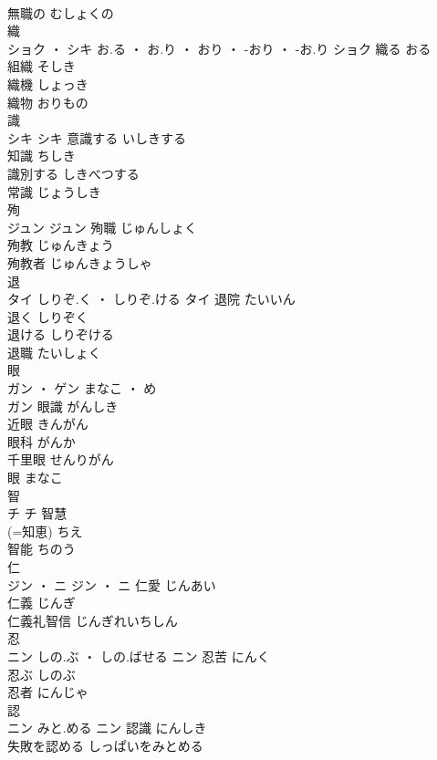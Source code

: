 \documentclass[8pt]{extreport}
\begin{document}
\begin{CJK}{UTF8}{min}
\\	無職の	むしょくの	
\\	織	
\\	ショク ・ シキ	お.る ・ お.り ・ おり ・ -おり ・ -お.り	ショク	織る	おる	
\\	組織	そしき	
\\	織機	しょっき	
\\	織物	おりもの	
\\	識	
\\	シキ		シキ	意識する	いしきする	
\\	知識	ちしき	
\\	識別する	しきべつする	
\\	常識	じょうしき	
\\	殉	
\\	ジュン		ジュン	殉職	じゅんしょく	
\\	殉教	じゅんきょう	
\\	殉教者	じゅんきょうしゃ	
\\	退	
\\	タイ	しりぞ.く ・ しりぞ.ける	タイ	退院	たいいん	
\\	退く	しりぞく	
\\	退ける	しりぞける	
\\	退職	たいしょく	
\\	眼	
\\	ガン ・ ゲン	まなこ ・ め
\\	ガン	眼識	がんしき	
\\	近眼	きんがん	
\\	眼科	がんか	
\\	千里眼	せんりがん	
\\	眼	まなこ	
\\	智	
\\	チ		チ	智慧
\\	(=知恵)	ちえ	
\\	智能	ちのう	
\\	仁	
\\	ジン ・ ニ		ジン ・ ニ	仁愛	じんあい	
\\	仁義	じんぎ	
\\	仁義礼智信	じんぎれいちしん	
\\	忍	
\\	ニン	しの.ぶ ・ しの.ばせる	ニン	忍苦	にんく	
\\	忍ぶ	しのぶ	
\\	忍者	にんじゃ	
\\	認	
\\	ニン	みと.める	ニン	認識	にんしき	
\\	失敗を認める	しっぱいをみとめる	

\end{CJK}
\end{document}
